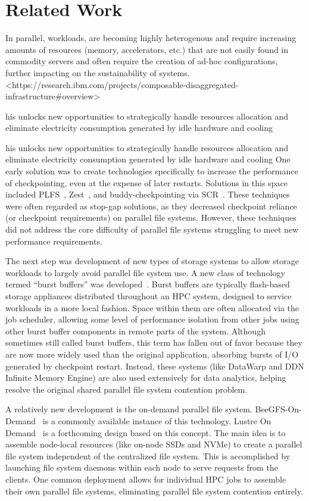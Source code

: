 \section{Related Work}

In parallel, workloads, are becoming highly heterogenous and require increasing amounts of resources (memory, accelerators, etc.) that are not easily found in commodity servers and often require the creation of ad-hoc configurations, further impacting on the sustainability of systems. <https://research.ibm.com/projects/composable-disaggregated-infrastructure#overview>

his unlocks new opportunities to strategically handle resources allocation and eliminate electricity consumption generated by idle hardware and cooling

his unlocks new opportunities to strategically handle resources allocation and eliminate electricity consumption generated by idle hardware and cooling
One early solution was to create technologies specifically to increase the performance of checkpointing, even at the expense of later restarts. Solutions in this space included PLFS~\cite{plfs}, Zest~\cite{zest}, and buddy-checkpointing via SCR~\cite{scr}. These techniques were often regarded as stop-gap solutions, as they decreased checkpoint reliance (or checkpoint requirements) on parallel file systems. However, these techniques did not address the core difficulty of parallel file systems struggling to meet new performance requirements.

The next step was development of new types of storage systems to allow storage workloads to largely avoid parallel file system use. A new class of technology termed ``burst buffers'' was developed~\cite{burstbuffers}. Burst buffers are typically flash-based storage appliances distributed throughout an HPC system, designed to service workloads in a more local fashion. Space within them are often allocated via the job scheduler, allowing some level of performance isolation from other jobs using other burst buffer components in remote parts of the system. Although sometimes still called burst buffers, this term has fallen out of favor because they are now more widely used than the original application, absorbing bursts of I/O generated by checkpoint restart. Instead, these systems (like DataWarp and DDN Infinite Memory Engine) are also used extensively for data analytics, helping resolve the original shared parallel file system contention problem.

A relatively new development is the on-demand parallel file system. BeeGFS-On-Demand~\cite{beeond} is a commonly available instance of this technology. Lustre On Demand~\cite{lustre-on-demand} is a forthcoming design based on this concept. The main idea is to assemble node-local resources (like on-node SSDs and NVMe) to create a parallel file system independent of the centralized file system. This is accomplished by launching file system daemons within each node to serve requests from the clients. One common deployment allows for individual HPC jobs to assemble their own parallel file systems, eliminating parallel file system contention entirely.

